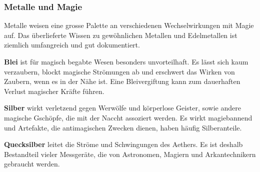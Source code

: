 \documentclass[10pt,twoside,twocolumn,openany]{book}
\begin{document}
\begin{multicols}{2}
	\subsubsection{Metalle und Magie}
	Metalle weisen eine grosse Palette an verschiedenen Wechselwirkungen mit Magie auf. Das überlieferte Wissen zu gewöhnlichen Metallen und Edelmetallen ist ziemlich umfangreich und gut dokumentiert.
	
	\textbf{Blei} ist für magisch begabte Wesen besonders unvorteilhaft. Es lässt sich kaum verzaubern, blockt magische Strömungen ab und erschwert das Wirken von Zaubern, wenn es in der Nähe ist. Eine Bleivergiftung kann zum dauerhaften Verlust magischer Kräfte führen. 
	
	\textbf{Silber} wirkt verletzend gegen Werwölfe und körperlose Geister, sowie andere magische Gschöpfe, die mit der Naccht assoziert werden. Es wirkt magiebannend und Artefakte, die antimagischen Zwecken dienen, haben häufig Silberanteile.
	
	\textbf{Quecksilber} leitet die Ströme und Schwingungen des Aethers. Es ist deshalb Bestandteil vieler Messgeräte, die von Astronomen, Magiern und Arkantechnikern gebraucht werden.
	
\end{multicols}
\end{document}
